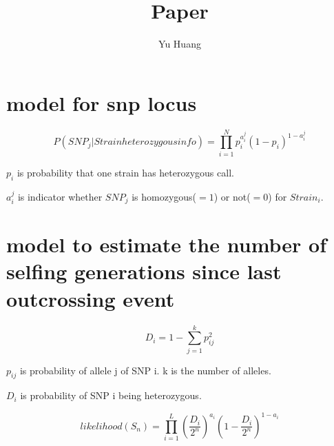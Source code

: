 \documentclass[a4paper,10pt]{article}
\title{Paper}
\author{Yu Huang}
\begin{document}
\maketitle

\begin{abstract}

\end{abstract}

\section{model for snp locus}
\begin{equation}
P({SNP}_j|Strain heterozygous info) = \prod_{i=1}^{N} p_i^{a_i^j} (1-p_i)^{1-a_i^j}
\end{equation}


$p_i$ is probability that one strain has heterozygous call.


$a_i^j$ is indicator whether ${SNP}_j$ is homozygous($=1$) or not($=0$) for ${Strain}_i$.


\section{model to estimate the number of selfing generations since last outcrossing event}
\begin{equation}
D_i = 1 - \sum_{j=1}^k p_{ij}^2
\end{equation}


$p_{ij}$ is probability of allele j of SNP i. k is the number of alleles.

$D_i$ is probability of SNP i being heterozygous.


\begin{equation}
likelihood(S_n) = \prod_{i=1}^L {(\frac{D_i}{2^n})}^{a_i} {(1-\frac{D_i}{2^n})}^{1-a_i}
\end{equation}
\end{document}
